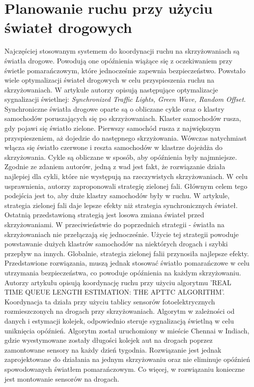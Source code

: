 \section{Planowanie ruchu przy użyciu świateł drogowych}

\indent
Najczęściej stosowanym systemem do koordynacji ruchu na skrzyżowaniach są światła drogowe. Powodują one opóźnienia wiążące się z oczekiwaniem przy świetle pomarańczowym, które jednocześnie zapewnia bezpieczeństwo. Powstało wiele optymalizacji świateł drogowych w celu przyspieszenia ruchu na skrzyżowaniach.
\newline
\indent
W artykule \cite{brockfeld2001optimizing} autorzy opisują następujące optymalizacje sygnalizacji świetlnej: \textit{Synchronized Traffic Lights, Green Wave, Random Offset}. Synchroniczne światła drogowe oparte są o obliczane cykle oraz o klastry samochodów poruszających się po skrzyżowaniach. Klaster samochodów rusza, gdy pojawi się światło zielone. Pierwszy samochód rusza z największym przyspieszeniem, aż dojedzie do następnego skrzyżowania. Wówczas natychmiast włącza się światło czerwone i reszta samochodów w klastrze dojeżdża do skrzyżowania. Cykle są obliczane w sposób, aby opóźnienia były najmniejsze. Zgodnie ze zdaniem autorów, jedną z wad jest fakt, że rozwiązanie działa najlepiej dla cykli, które nie występują na rzeczywistych skrzyżowaniach. W celu usprawnienia, autorzy zaproponowali strategię zielonej fali. Głównym celem tego podejścia jest to, aby duże klastry samochodów były w ruchu. W artykule, strategia zielonej fali daje lepsze efekty niż strategia synchronicznych świateł. Ostatnią przedstawioną strategią jest losowa zmiana świateł przed skrzyżowaniami. W przeciwieństwie do poprzednich strategii - światła na skrzyżowaniach nie przełączają się jednocześnie. Użycie tej strategii powoduje powstawanie dużych klastrów samochodów na niektórych drogach i szybki przepływ na innych. Globalnie, strategia zielonej falii przynosiła najlepsze efekty. Przedstawione rozwiązania, muszą jednak stosować światło pomarańczowe w celu utrzymania bezpieczeństwa, co powoduje opóźnienia na każdym skrzyżowaniu.
\newline
\indent
Autorzy artykułu \cite{athmaraman2005adaptive} opisują koordynację ruchu przy użyciu algorytmu 'REAL TIME QUEUE LENGTH ESTIMATION: THE APTTC ALGORITHM'. Koordynacja ta działa przy użyciu tablicy sensorów fotoelektrycznych rozmieszczonych na drogach przy skrzyżowaniach. Algorytm w zależności od danych i estymacji kolejek, odpowiednio steruje sygnalizacją świetlną w celu uniknięcia opóźnień. Algorytm został uruchomiony w mieście Chennai w Indiach, gdzie wyestymowane zostały długości kolejek aut na drogach poprzez zamontowane sensory na każdy dzień tygodnia. Rozwiązanie jest jednak zaprojektowane do działania na jednym skrzyżowaniu oraz nie eliminuje opóźnień spowodowanych światłem pomarańczowym. Co więcej, w rozwiązaniu konieczne jest montowanie sensorów na drogach.
